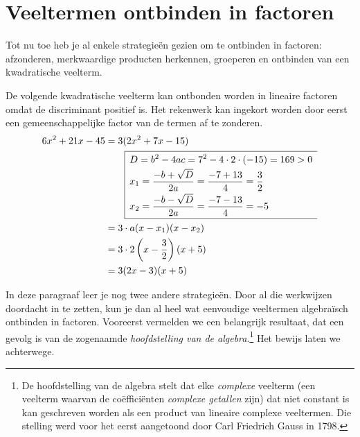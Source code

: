 \documentclass{ximera}
\begin{document}
	\author{Koen de Naeghel - Wiskunde Op Maat}




	\section{Veeltermen ontbinden in factoren}

	Tot nu toe heb je al enkele strategie\"en gezien om te ontbinden in factoren: afzonderen, merkwaardige producten herkennen, groeperen en ontbinden van een kwadratische veelterm.
	
	\begin{example} 
	De volgende kwadratische veelterm kan ontbonden worden in lineaire factoren omdat de discriminant positief is. Het rekenwerk kan ingekort worden door eerst een gemeenschappelijke factor van de termen af te zonderen. 
	\begin{align*}
	6x^2+21x-45 & = 3(2x^2 + 7x - 15) \\
	& \qquad 
	\begin{array}{|l}
	\hline
	\begin{aligned}
	\vrule height 0.4cm width 0cm
	& D = b^2 - 4ac = 7^2-4\cdot 2 \cdot (-15) = 169 > 0 \\[0.1cm] 
	& x_{1} = \frac{-b + \sqrt{D}}{2a} = \frac{-7 + 13}{4} = \frac{3}{2} \\[0.1cm] 
	& x_{2} = \frac{-b - \sqrt{D}}{2a} = \frac{-7 - 13}{4} = -5 \\[0.1cm]
	\end{aligned} \\
	\hline
	\end{array} \\
	& = 3 \cdot a(x-x_1)(x-x_2) \\
	& = 3 \cdot 2\left(x- \frac{3}{2}\right)(x+5) \\
	& = 3(2x-3)(x+5)
	\end{align*}
	\end{example} 
	
	In deze paragraaf leer je nog twee andere strategie\"en. Door al die werkwijzen doordacht in te zetten, kun je dan al heel wat eenvoudige veeltermen algebra\"isch ontbinden in factoren. Vooreerst vermelden we een belangrijk resultaat, dat een gevolg is van de zogenaamde {\em hoofdstelling van de algebra}.\footnote{De hoofdstelling van de algebra stelt dat elke {\em complexe} veelterm (een veelterm waarvan de co\"effici\"enten {\em complexe getallen} zijn) dat niet constant is kan geschreven worden als een product van lineaire complexe veeltermen. Die stelling werd voor het eerst aangetoond door Carl Friedrich Gauss in 1798.} Het bewijs laten we achterwege.
	
\end{document}
